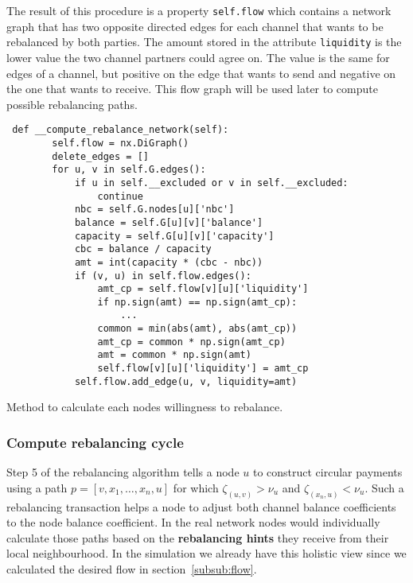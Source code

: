 \documentclass[final]{fhnwreport}       %
\begin{document}
The result of this procedure is a property \texttt{self.flow} which contains a network graph that has two opposite directed edges for each channel that wants to be rebalanced by both parties. The amount stored in the attribute \texttt{liquidity} is the lower value the two channel partners could agree on. The value is the same for edges of a channel, but positive on the edge that wants to send and negative on the one that wants to receive. This flow graph will be used later to compute possible rebalancing paths. 

\begin{listing}[H]
  \begin{verbatim}
 def __compute_rebalance_network(self):
        self.flow = nx.DiGraph()
        delete_edges = []
        for u, v in self.G.edges():
            if u in self.__excluded or v in self.__excluded:
                continue
            nbc = self.G.nodes[u]['nbc']
            balance = self.G[u][v]['balance']
            capacity = self.G[u][v]['capacity']
            cbc = balance / capacity
            amt = int(capacity * (cbc - nbc))
            if (v, u) in self.flow.edges():
                amt_cp = self.flow[v][u]['liquidity']
                if np.sign(amt) == np.sign(amt_cp):
                    ...
                common = min(abs(amt), abs(amt_cp))
                amt_cp = common * np.sign(amt_cp)
                amt = common * np.sign(amt)
                self.flow[v][u]['liquidity'] = amt_cp
            self.flow.add_edge(u, v, liquidity=amt)
  \end{verbatim}
  \caption{Method to calculate each nodes willingness to rebalance.}
  \label{code:comp_flow}
\end{listing}

\subsubsection{Compute rebalancing cycle}
Step 5 of the rebalancing algorithm tells a node $u$ to construct circular payments using a path $p = [v,x_1,\dots,x_n,u]$ for which $\zeta_{(u,v)}>\nu_u$ and $\zeta_{(x_n,u)}<\nu_u$. Such a rebalancing transaction helps a node to adjust both channel balance coefficients to the node balance coefficient. In the real network nodes would individually calculate those paths based on the \textbf{rebalancing hints} they receive from their local neighbourhood. In the simulation we already have this holistic view since we calculated the desired flow in section~\ref{subsub:flow}. 
\end{document}
